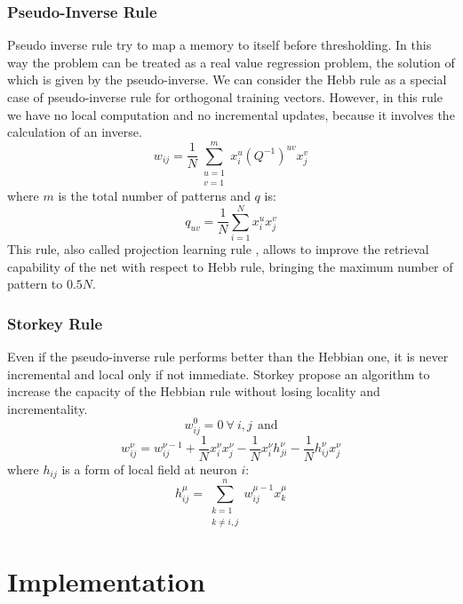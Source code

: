 \documentclass[letterpaper,twocolumn,10pt]{article}
\begin{document}
\subsubsection{Pseudo-Inverse Rule}
Pseudo inverse rule try to map a memory to itself before thresholding. In this way the problem can be treated as a real value regression problem, the solution of which is given by the pseudo-inverse. We can consider the Hebb rule as a special case of pseudo-inverse rule for orthogonal training vectors. However, in this rule we have no local computation and no incremental updates, because it involves the calculation of an inverse.
\begin{displaymath}
	w_{ij} = \frac{1}{N} \sum_{\substack{u=1\\v=1    }}^m x_i^u (Q^{-1})^{uv} x_j^v
\end{displaymath}
where $m$ is the total number of patterns and $q$ is:
\begin{displaymath}
	q_{uv} = \frac{1}{N} \sum_{i=1}^N x_i^u x_j^v
\end{displaymath}
This rule, also called projection learning rule \cite{personnazcoll}, allows to improve the retrieval capability of the net with respect to Hebb rule, bringing the maximum number of pattern to $0.5N$.

\subsubsection{Storkey Rule \cite{Storkey97increasingthe}}
Even if the pseudo-inverse rule performs better than the Hebbian one, it is never incremental and local only if not immediate. Storkey propose an algorithm to increase the capacity of the Hebbian rule without losing locality and incrementality.
\begin{displaymath}
	w_{ij}^0=0\ \forall\ i,j\ \ \text{and}
\end{displaymath}
\begin{displaymath}
	w_{ij}^{\nu} = w_{ij}^{\nu-1}+ \frac{1}{N} x_i^{\nu}x_j^{\nu} - \frac{1}{N} x_i^{\nu}h_{ji}^{\nu} - \frac{1}{N} h_{ij}^{\nu}x_j^{\nu}  
\end{displaymath}
where $h_{ij}$ is a form of local field at neuron $i$:
\begin{displaymath}
	h_{ij}^{\mu} = \sum_{\substack{k=1\\k\neq i,j}}^n w_{ij}^{\mu-1} x_k^{\mu}
\end{displaymath}

\section{Implementation}
\end{document}
